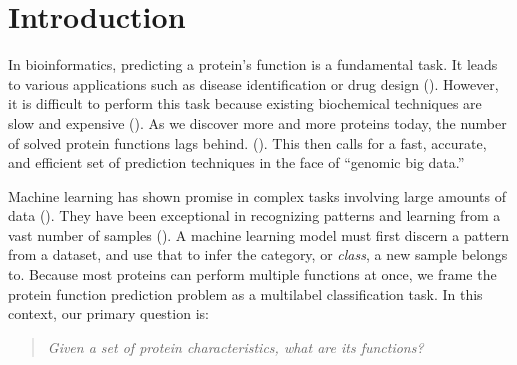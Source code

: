 %
%
%
%
%

\chapter{Introduction}
\label{Introduction}

\par In bioinformatics, predicting a protein's function is a fundamental task.
It leads to various applications such as disease identification or drug design
(\cite{baldi2001bioinformatics}). However, it is difficult to perform this task
because existing biochemical techniques are slow and expensive
(\cite{cozzetto2017computational}). As we discover more and more proteins
today, the number of solved protein functions lags behind.
(\cite{gaudet2017gene}). This then calls for a fast, accurate, and efficient
set of prediction techniques in the face of ``genomic big data.''
  
\par Machine learning has shown promise in complex tasks involving large
amounts of data (\cite{chen2014data}). They have been exceptional in
recognizing patterns and learning from a vast number of samples
(\cite{lecun2015deep}). A machine learning model must first
discern a pattern from a dataset, and use that to infer the category, or
\textit{class}, a new sample belongs to. Because most proteins can perform
multiple functions at once, we frame the protein function prediction problem
as a multilabel classification task. In this context, our primary question is:

\begin{quote}
    \itshape
    \small
    Given a set of protein characteristics, what are its functions?
\end{quote}

